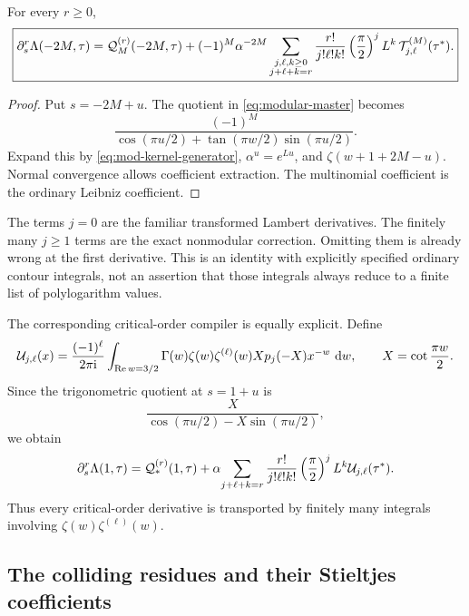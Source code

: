 \begin{corollary}\label{cor:mod-jets}
For every \(r\geq0\),
\begin{equation}\label{eq:mod-jets}
 \boxed{\displaystyle
 \partial_s^r\Lambda(-2M,\tau)
 ={\cal Q}_M^{(r)}(-2M,\tau)
  +(-1)^M\alpha^{-2M}
  \sum_{\substack{j,\ell,k\geq0\\j+\ell+k=r}}
       \frac{r!}{j!\ell!k!}
       \left(\frac{\pi}{2}\right)^j
       L^k\,{\cal T}_{j,\ell}^{(M)}(\tau^*).}
\end{equation}
\end{corollary}

\begin{proof}
Put \(s=-2M+u\). The quotient in
\eqref{eq:modular-master} becomes
\[
 \frac{(-1)^M}
 {\cos(\pi u/2)+\tan(\pi w/2)\sin(\pi u/2)}.
\]
Expand this by \eqref{eq:mod-kernel-generator},
\(\alpha^u=e^{Lu}\), and
\(\zeta(w+1+2M-u)\). Normal convergence allows coefficient
extraction. The multinomial coefficient is the ordinary
Leibniz coefficient.
\end{proof}

The terms \(j=0\) are the familiar transformed Lambert
derivatives. The finitely many \(j\geq1\) terms are the exact
nonmodular correction. Omitting them is already wrong at the
first derivative. This is an identity with explicitly specified
ordinary contour integrals, not an assertion that those integrals
always reduce to a finite list of polylogarithm values.

The corresponding critical-order compiler is equally explicit.
Define
\begin{equation}\label{eq:Umod}
 {\cal U}_{j,\ell}(x)=
 \frac{(-1)^\ell}{2\pi\mathrm i}
 \int_{\operatorname{Re} w=3/2}
    \Gamma(w)\zeta(w)\zeta^{(\ell)}(w)
    Xp_j(-X)x^{-w}\,\,\mathrm d w,\qquad
    X=\cot\frac{\pi w}{2}.
\end{equation}
Since the trigonometric quotient at \(s=1+u\) is
\[
 \frac{X}{\cos(\pi u/2)-X\sin(\pi u/2)},
\]
we obtain
\begin{equation}\label{eq:critical-mod-jets}
 \partial_s^r\Lambda(1,\tau)
  ={\cal Q}_*^{(r)}(1,\tau)
   +\alpha\!
    \sum_{j+\ell+k=r}\frac{r!}{j!\ell!k!}
          \left(\frac{\pi}{2}\right)^j L^k
                                  {\cal U}_{j,\ell}(\tau^*).
\end{equation}
Thus every critical-order derivative is transported by finitely
many integrals involving \(\zeta(w)\zeta^{(\ell)}(w)\).

\subsection{The colliding residues and their Stieltjes coefficients}

